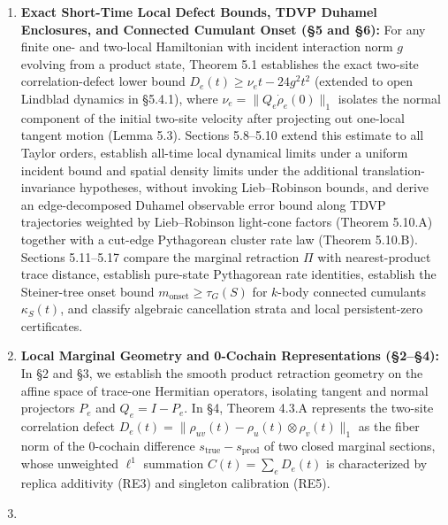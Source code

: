\documentclass[
  11pt,
]{article}
\providecommand{\tightlist}{%
  \setlength{\itemsep}{0pt}\setlength{\parskip}{0pt}}
\providecommand{\tightlist}{%
  \setlength{\itemsep}{0pt}\setlength{\parskip}{0pt}}
\begin{document}
\begin{enumerate}
\def\labelenumi{\arabic{enumi}.}
\tightlist
\item
  \textbf{Exact Short-Time Local Defect Bounds, TDVP Duhamel Enclosures, and Connected Cumulant Onset (§5 and §6):} For any finite one- and two-local Hamiltonian with incident interaction norm \(g\) evolving from a product state, Theorem 5.1 establishes the exact two-site correlation-defect lower bound \(D_e(t)\ge\nu_e t-24g^2t^2\) (extended to open Lindblad dynamics in §5.4.1), where \(\nu_e=\lVert Q_e\dot\rho_e(0)\rVert_1\) isolates the normal component of the initial two-site velocity after projecting out one-local tangent motion (Lemma 5.3). Sections 5.8--5.10 extend this estimate to all Taylor orders, establish all-time local dynamical limits under a uniform incident bound and spatial density limits under the additional translation-invariance hypotheses, without invoking Lieb--Robinson bounds, and derive an edge-decomposed Duhamel observable error bound along TDVP trajectories weighted by Lieb--Robinson light-cone factors (Theorem 5.10.A) together with a cut-edge Pythagorean cluster rate law (Theorem 5.10.B). Sections 5.11--5.17 compare the marginal retraction \(\Pi\) with nearest-product trace distance, establish pure-state Pythagorean rate identities, establish the Steiner-tree onset bound \(m_{\mathrm{onset}}\ge\tau_G(S)\) for \(k\)-body connected cumulants \(\kappa_S(t)\), and classify algebraic cancellation strata and local persistent-zero certificates.
\item
  \textbf{Local Marginal Geometry and 0-Cochain Representations (§2--§4):} In §2 and §3, we establish the smooth product retraction geometry on the affine space of trace-one Hermitian operators, isolating tangent and normal projectors \(P_e\) and \(Q_e=I-P_e\). In §4, Theorem 4.3.A represents the two-site correlation defect \(D_e(t)=\lVert\rho_{uv}(t)-\rho_u(t)\otimes\rho_v(t)\rVert_1\) as the fiber norm of the 0-cochain difference \(s_{\mathrm{true}}-s_{\mathrm{prod}}\) of two closed marginal sections, whose unweighted \(\ell^1\) summation \(C(t)=\sum_e D_e(t)\) is characterized by replica additivity (RE3) and singleton calibration (RE5).
\item

\end{enumerate}
\end{document}
